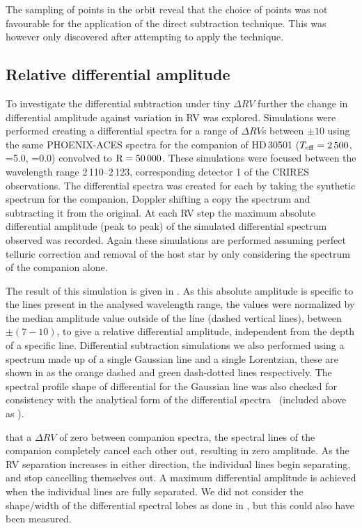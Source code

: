 The sampling of points in the orbit reveal that the choice of points was not favourable for the application of the direct subtraction technique. This was however only discovered after attempting to apply the technique. 




\subsection{Relative differential amplitude}
To investigate the differential subtraction under tiny \(\Delta RV\) further the change in differential amplitude against variation in {RV} was explored. 
Simulations were performed creating a differential spectra for a range of \(\Delta {RV}\)s between \(\pm10\)\kmps{} using the same {PHOENIX-ACES} spectra for the companion of {HD\,30501} (\(T_{\mathrm{eff}}{}=2\,500\)\K{}, \logg{}=5.0, \feh{}=0.0) convolved to \(\textrm{R}=50\,000\). These simulations were focused between the wavelength range 2\,110--2\,123\nm{}, corresponding detector 1 of the {CRIRES} observations. The differential spectra was created for each by taking the synthetic spectrum for the companion, Doppler shifting a copy the spectrum and subtracting it from the original. At each {RV} step the maximum absolute differential amplitude (peak to peak) of the simulated differential spectrum observed was recorded. Again these simulations are performed assuming perfect telluric correction and removal of the host star by only considering the spectrum of the companion alone. 

The result of this simulation is given in . As this absolute amplitude is specific to the lines present in the analysed wavelength range, the values were normalized by the median amplitude value outside of the line {\fwhm} (dashed vertical lines), between \(\pm(7-10)\)\kmps{}, to give a relative differential amplitude, independent from the depth of a specific line. Differential subtraction simulations we also performed using a spectrum made up of a single Gaussian line and a single Lorentzian, these are shown in  as the orange dashed and green dash-dotted lines respectively. The spectral profile shape of differential for the Gaussian line was also checked for consistency with the analytical form of the differential spectra~\citet[][Equation~A.1]{ferluga_separating_1997} (included above as ).

 that a \(\Delta {RV}\) of zero between companion spectra, the spectral lines of the companion completely cancel each other out, resulting in zero amplitude. As the {RV} separation increases in either direction, the individual lines begin separating, and stop cancelling themselves out. A maximum differential amplitude is achieved when the individual lines are fully separated. We did not consider the shape/width of the differential spectral lobes as done in \citet[][eqn.~A.1]{ferluga_separating_1997}, but this could also have been measured.


